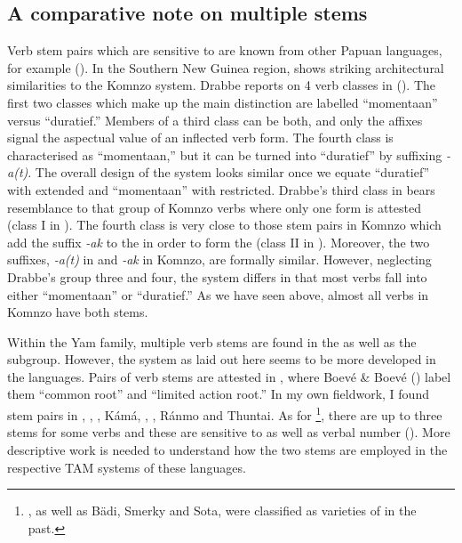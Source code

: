 \subsection{A comparative note on multiple stems} \label{comparativenoteextrs}

Verb stem pairs which are sensitive to  are known from other Papuan languages, for example  (\citealt[245]{Fedden:2011wu}). In the Southern New Guinea region,  shows striking architectural similarities to the Komnzo system. Drabbe reports on 4 verb classes in  (\citeyear[31]{Drabbe:1955tm}). The first two classes which make up the main distinction are labelled ``momentaan'' versus ``duratief.'' Members of a third class can be both, and only the affixes signal the aspectual value of an inflected verb form. The fourth class is characterised as ``momentaan,'' but it can be turned into ``duratief'' by suffixing \emph{-a(t)}. The overall design of the  system looks similar once we equate ``duratief'' with extended and ``momentaan'' with restricted. Drabbe's third class in  bears resemblance to that group of Komnzo verbs where only one form is attested (class I in ). The fourth class is very close to those stem pairs in Komnzo which add the suffix \emph{-ak} to the  in order to form the  (class II in ). Moreover, the two suffixes, \emph{-a(t)} in  and \emph{-ak} in Komnzo, are formally similar. However, neglecting Drabbe's group three and four, the  system differs in that most verbs fall into either ``momentaan'' or ``duratief.'' As we have seen above, almost all verbs in Komnzo have both stems.%

Within the Yam family, multiple verb stems are found in the  as well as the  subgroup. However, the system as laid out here seems to be more developed in the  languages. Pairs of verb stems are attested in , where Boevé \& Boevé (\citeyear{Bouve:2003ar}) label them ``common root'' and ``limited action root.'' In my own fieldwork, I found stem pairs in , , , Kámá, , , Ránmo and  Thuntai. As for \footnote{, as well as Bädi, Smerky and Sota, were classified as varieties of  in the past.}, there are up to three stems for some verbs and these are sensitive to  as well as verbal number (\citealt{Carroll:Ngkolmpu}). More descriptive work is needed to understand how the two stems are employed in the respective TAM systems of these languages.%

